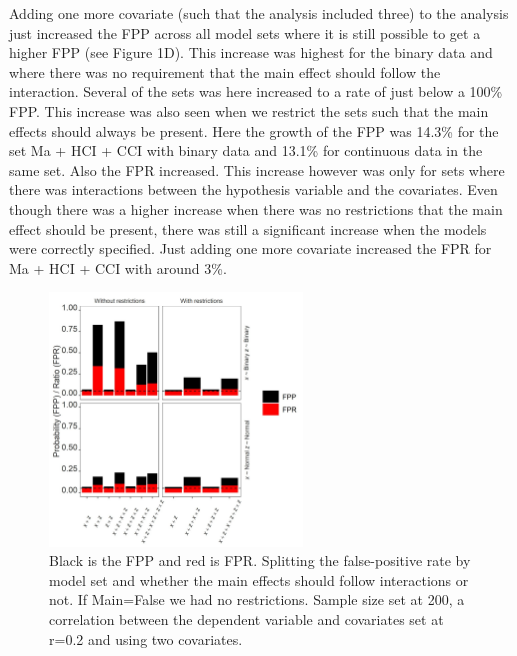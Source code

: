 Adding one more covariate (such that the analysis included three) to the analysis just increased the FPP across all model sets where it is still possible to get a higher FPP (see Figure 1D). This increase was highest for the binary data and where there was no requirement that the main effect should follow the interaction. Several of the sets was here increased to a rate of just below a 100\% FPP. This increase was also seen when we restrict the sets such that the main effects should always be present. Here the growth of the FPP was 14.3\% for the set Ma + HCI + CCI with binary data and 13.1\% for continuous data in the same set. Also the FPR increased. This increase however was only for sets where there was interactions between the hypothesis variable and the covariates. Even though there was a higher increase when there was no restrictions that the main effect should be present, there was still a significant increase when the models were correctly specified. Just adding one more covariate increased the FPR for Ma + HCI + CCI with around 3\%. 

\begin{figure}[t]
\includegraphics[width=0.6\textwidth]{R/Analysis/Result/Figures/Figure1A.jpeg}
\centering
\caption{Black is the FPP and red is FPR.  Splitting the false-positive rate by model set and whether the main effects should follow interactions or not. If Main=False we had no restrictions. Sample size set at 200, a correlation between the dependent variable and covariates set at r=0.2 and using two covariates.}
\label{fig:mainfigure}
\end{figure}

